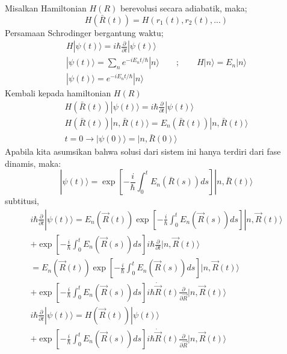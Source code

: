 Misalkan Hamiltonian $H(R)$ berevolusi secara adiabatik, maka;
\begin{equation}
  H(\bar{R}(t)) = H(r_1(t), r_2(t), ...)
\end{equation}
Persamaan Schrodinger bergantung waktu;
\begin{align}
  H|\psi(t)\rangle = i \hbar \frac{\partial}{\partial t}|\psi(t)\rangle  \\
  |\psi(t)\rangle = \sum_n e^{-iE_nt/\hbar} |n\rangle \qquad ; \qquad H|n \rangle = E_n|n\rangle \\ 
  |\psi(t)\rangle = e^{-iE_nt/\hbar} |n \rangle
\end{align}
Kembali kepada hamiltonian $H(R)$
\begin{align}
  H(\bar{R}(t))|\psi(t)\rangle = i\hbar \frac{\partial}{\partial t} |\psi(t)\rangle  \\ 
  H(\bar{R}(t))|n, \bar{R}(t)\rangle = E_n(\bar{R}(t)) |n, \bar{R}(t)\rangle \\ 
    t = 0 \rightarrow |\psi(0) \rangle = |n, \bar{R}(0) \rangle
\end{align}
Apabila kita asumsikan bahwa solusi dari sistem ini hanya terdiri dari fase dinamis, maka:
\begin{equation}
  |\psi(t)\rangle = \exp \left[ -\frac{i}{\hbar} \int_0^t E_n (\bar{R}(s))ds \right] |n, \bar{R}(t) \rangle 
\end{equation}
subtitusi,
\begin{align}
  i\hbar \frac{\partial}{\partial t}|\psi(t)\rangle = E_n \left( \vec{R}(t) \right) \exp \left[ -\frac{i}{\hbar} \int_{0}^{t} E_n (\vec{R}(s)) ds \right] |n, \vec{R}(t) \rangle \\ 
  + \exp \left[ -\frac{i}{\hbar} \int_{0}^{t} E_n (\vec{R}(s)) ds \right] i\hbar \frac{\partial}{\partial t} |n, \vec{R}(t) \rangle \\ 
  = E_n \left( \vec{R}(t) \right) \exp \left[ -\frac{i}{\hbar} \int_{0}^{t} E_n (\vec{R}(s)) ds \right] |n, \vec{R}(t) \rangle \\ 
   + \exp \left[ -\frac{i}{\hbar} \int_{0}^{t} E_n (\vec{R}(s)) ds \right] i\hbar \dot{\vec{R}}(t) \frac{\partial}{\partial \vec{R}} |n, \vec{R}(t) \rangle \\ 
   i\hbar \frac{\partial}{\partial t}|\psi(t)\rangle = H(\vec{R}(t)) |\psi(t) \rangle \\ 
  + \exp \left[ -\frac{i}{\hbar} \int_{0}^{t} E_n (\vec{R}(s)) ds \right] i\hbar \dot{\vec{R}}(t) \frac{\partial}{\partial \vec{R}} |n, \vec{R}(t) \rangle  
\end{align}
